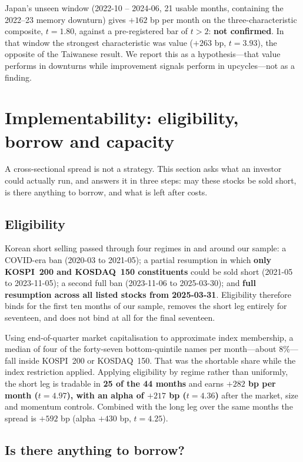 \documentclass[12pt,a4paper]{article}
\begin{document}
Japan's unseen window (2022-10 -- 2024-06, 21 usable months, containing the 2022--23 memory downturn) gives $+162$ bp per month on the three-characteristic composite, $t=1.80$, against a pre-registered bar of $t>2$: \textbf{not confirmed}. In that window the strongest characteristic was
value ($+263$ bp, $t=3.93$), the opposite of the Taiwanese result. We report this as a hypothesis---that value performs
in downturns while improvement signals perform in upcycles---not as a finding.

\section{Implementability: eligibility, borrow and capacity}\label{sec:impl}

A cross-sectional spread is not a strategy. This section asks what an investor could actually run, and answers it in
three steps: may these stocks be sold short, is there anything to borrow, and what is left after costs.

\subsection{Eligibility}

Korean short selling passed through four regimes in and around our sample: a COVID-era ban (2020-03 to 2021-05); a
partial resumption in which \textbf{only KOSPI~200 and KOSDAQ~150 constituents} could be sold short (2021-05 to
2023-11-05); a second full ban (2023-11-06 to 2025-03-30); and \textbf{full resumption across all listed stocks from
2025-03-31}. Eligibility therefore binds for the first ten months of our sample, removes the short leg entirely for
seventeen, and does not bind at all for the final seventeen.

Using end-of-quarter market capitalisation to approximate index membership, a median of four of the forty-seven
bottom-quintile names per month---about 8\%---fall inside KOSPI~200 or KOSDAQ~150. That was the shortable share while
the index restriction applied. Applying eligibility by regime rather than uniformly, the short leg is tradable in
\textbf{25 of the 44 months} and earns \textbf{$+282$ bp per month ($t=4.97$), with an alpha of $+217$ bp ($t=4.36$)}
after the market, size and momentum controls. Combined with the long leg over the same months the spread is $+592$ bp
(alpha $+430$ bp, $t=4.25$).

\subsection{Is there anything to borrow?}
\end{document}
